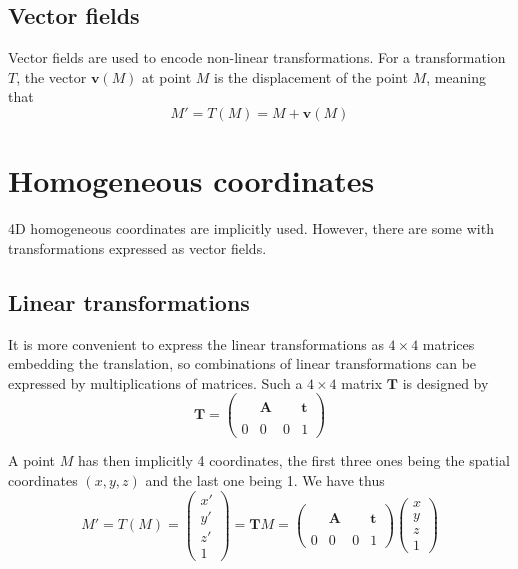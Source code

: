 \subsection{Vector fields}

Vector fields are used to encode non-linear transformations. For a transformation $T$, the vector $\mathbf{v}(M)$ at point $M$ is the displacement of the point $M$, meaning that 
\begin{displaymath}
M' = T(M) = M + \mathbf{v}(M)
\end{displaymath}







\section{Homogeneous coordinates}
\label{sec:homogeneous}

4D homogeneous coordinates are implicitly used. However, there are some  with transformations expressed as vector fields. 

\subsection{Linear transformations}
\label{sec:homogeneous:linear}

It is more convenient to express the linear transformations as $4 \times 4$ matrices embedding the translation, so combinations of linear transformations can be expressed by multiplications of matrices. Such a $4 \times 4$ matrix $\mathbf{T}$ is designed by
\begin{displaymath}
\mathbf{T} =
\left(
\begin{array}{ccc|c}
& & & \\
& \mathbf{A} & & \mathbf{t} \\
& & & \\ \hline
0 & 0 & 0 & 1
\end{array}
\right)
\end{displaymath}

A point $M$ has then implicitly 4 coordinates, the first three ones being the spatial coordinates $(x,y,z)$ and the last one being 1. We have thus 
\begin{displaymath}
M'
= T(M)
=
\left(
\begin{array}{l}
x' \\ y' \\ z' \\ 1
\end{array}
\right)
= \mathbf{T} M
= 
\left(
\begin{array}{ccc|c}
& & & \\
& \mathbf{A} & & \mathbf{t} \\
& & & \\ \hline
0 & 0 & 0 & 1
\end{array}
\right)
\left(
\begin{array}{l}
x \\ y \\ z \\ 1
\end{array}
\right)
\end{displaymath}


